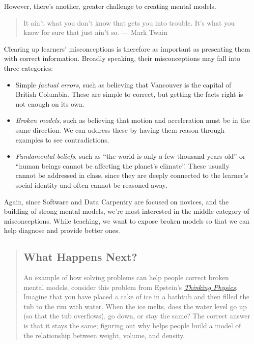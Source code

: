 However, there's another, greater challenge to creating mental models.

\begin{quote}   %
It ain't what you don't know that gets you into trouble.
It's what you know for sure that just ain't so.\newline
— Mark Twain
\end{quote}   %

Clearing up learners' misconceptions is therefore as important as
presenting them with correct information.
Broadly speaking,
their misconceptions may fall into three categories:

\begin{itemize}
\item Simple \emph{factual errors}, such as believing that Vancouver is the capital of British Columbia.
These are simple to correct,
but getting the facts right is not enough on its own.
\item \emph{Broken models}, such as believing that motion and acceleration must be in the same direction.
We can address these by having them reason through examples to see contradictions.
\item \emph{Fundamental beliefs},
such as ``the world is only a few thousand years old''
or ``human beings cannot be affecting the planet's climate''.
These usually cannot be addressed in class,
since they are deeply connected to the learner's social identity
and often cannot be reasoned away.
\end{itemize}

Again, since Software and Data Carpentry are focused on novices, and the building of
strong mental models, we're most interested in the middle category of misconceptions.
While teaching, we want to expose broken models so that we can help diagnose and
provide better ones.

\begin{quotation}   %
\subsection*{What Happens Next?}

An example of how solving problems can help people correct broken mental models,
consider this problem from Epstein's \emph{\href{http://www.amazon.com/Thinking-Physics-Understandable-Practical-Reality/dp/0935218084/r}{Thinking Physics}}.
Imagine that you have placed a cake of ice in a bathtub
and then filled the tub to the rim with water.
When the ice melts,
does the water level go up (so that the tub overflows),
go down,
or stay the same?
The correct answer is that it stays the same;
figuring out why helps people build a model of the relationship between weight, volume, and density.
\end{quotation}   %

